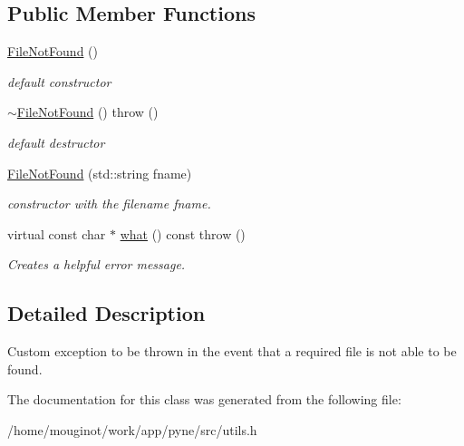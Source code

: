 \subsection*{Public Member Functions}
\begin{DoxyCompactItemize}
\item 
\mbox{\label{classpyne_1_1_file_not_found_aaae1bdf04df2b68377ae453929c8eb56}} 
\hyperlink{classpyne_1_1_file_not_found_aaae1bdf04df2b68377ae453929c8eb56}{File\+Not\+Found} ()
\begin{DoxyCompactList}\small\item\em default constructor \end{DoxyCompactList}\item 
\mbox{\label{classpyne_1_1_file_not_found_abc00e9c8711bb1b1bb2dc1dfd3a98745}} 
\hyperlink{classpyne_1_1_file_not_found_abc00e9c8711bb1b1bb2dc1dfd3a98745}{$\sim$\+File\+Not\+Found} ()  throw ()
\begin{DoxyCompactList}\small\item\em default destructor \end{DoxyCompactList}\item 
\mbox{\label{classpyne_1_1_file_not_found_a4d766115c01634b77aebe42269f9aead}} 
\hyperlink{classpyne_1_1_file_not_found_a4d766115c01634b77aebe42269f9aead}{File\+Not\+Found} (std\+::string fname)
\begin{DoxyCompactList}\small\item\em constructor with the filename {\itshape fname}. \end{DoxyCompactList}\item 
\mbox{\label{classpyne_1_1_file_not_found_a71e319e330fc7766264cf76a3f8ee529}} 
virtual const char $\ast$ \hyperlink{classpyne_1_1_file_not_found_a71e319e330fc7766264cf76a3f8ee529}{what} () const  throw ()
\begin{DoxyCompactList}\small\item\em Creates a helpful error message. \end{DoxyCompactList}\end{DoxyCompactItemize}


\subsection{Detailed Description}
Custom exception to be thrown in the event that a required file is not able to be found. 

The documentation for this class was generated from the following file\+:\begin{DoxyCompactItemize}
\item 
/home/mouginot/work/app/pyne/src/utils.\+h\end{DoxyCompactItemize}
